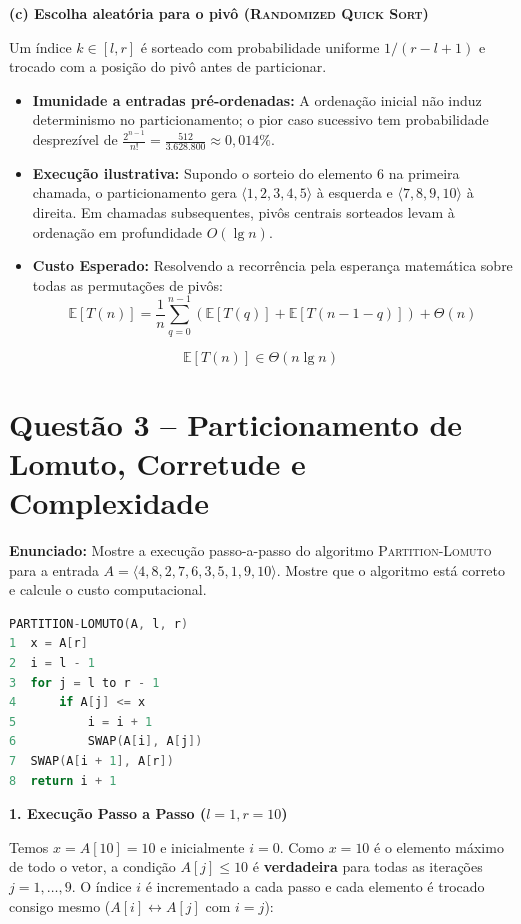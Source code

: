 \documentclass[11pt,a4paper]{article}
\newcommand{\res}[1]{\[\boxed{#1}\]}
\newcommand{\topico}[1]{\par\medskip\textbf{\color{azul}#1}\par}
\newcommand{\questao}[2]{\section*{Questão #1 -- #2}}
\begin{document}
\topico{(c) Escolha aleatória para o pivô (\textsc{Randomized Quick Sort})}
Um índice $k \in [l, r]$ é sorteado com probabilidade uniforme $1/(r-l+1)$ e trocado com a posição do pivô antes de particionar.
\begin{itemize}
  \item \textbf{Imunidade a entradas pré-ordenadas:} A ordenação inicial não induz determinismo no particionamento; o pior caso sucessivo tem probabilidade desprezível de $\frac{2^{n-1}}{n!} = \frac{512}{3.628.800} \approx 0{,}014\%$.
  \item \textbf{Execução ilustrativa:} Supondo o sorteio do elemento $6$ na primeira chamada, o particionamento gera $\langle 1, 2, 3, 4, 5 \rangle$ à esquerda e $\langle 7, 8, 9, 10 \rangle$ à direita. Em chamadas subsequentes, pivôs centrais sorteados levam à ordenação em profundidade $O(\lg n)$.
  \item \textbf{Custo Esperado:} Resolvendo a recorrência pela esperança matemática sobre todas as permutações de pivôs:
  \[
  \mathbb{E}[T(n)] = \frac{1}{n}\sum_{q=0}^{n-1} \left( \mathbb{E}[T(q)] + \mathbb{E}[T(n-1-q)] \right) + \Theta(n)
  \]
\end{itemize}
\res{\mathbb{E}[T(n)] \in \Theta(n \lg n)}

\newpage
\questao{3}{Particionamento de Lomuto, Corretude e Complexidade}

\textbf{Enunciado:} Mostre a execução passo-a-passo do algoritmo \textsc{Partition-Lomuto} para a entrada $A = \langle 4, 8, 2, 7, 6, 3, 5, 1, 9, 10 \rangle$. Mostre que o algoritmo está correto e calcule o custo computacional.

\begin{lstlisting}[language=C]
PARTITION-LOMUTO(A, l, r)
1  x = A[r]
2  i = l - 1
3  for j = l to r - 1
4      if A[j] <= x
5          i = i + 1
6          SWAP(A[i], A[j])
7  SWAP(A[i + 1], A[r])
8  return i + 1
\end{lstlisting}

\topico{1. Execução Passo a Passo ($l=1, r=10$)}
Temos $x = A[10] = 10$ e inicialmente $i = 0$.
Como $x = 10$ é o elemento máximo de todo o vetor, a condição $A[j] \le 10$ é \textbf{verdadeira} para todas as iterações $j = 1, \dots, 9$. O índice $i$ é incrementado a cada passo e cada elemento é trocado consigo mesmo ($A[i] \leftrightarrow A[j]$ com $i=j$):
\end{document}
